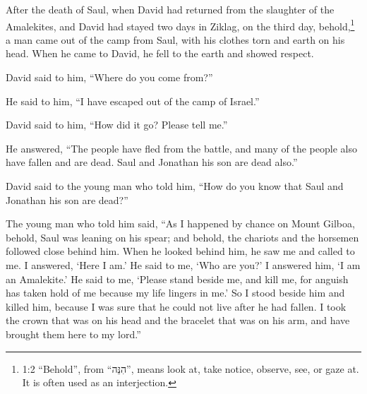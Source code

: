\newpage
\null
\thispagestyle{empty}
\newpage







\vspace{-1.36in}



\mychapter{} \myverse*{}After the death of Saul, when David had returned from the slaughter
of the Amalekites, and David had stayed two days in Ziklag,
\myverse{}on the third day, behold,\footnote{1:2 “Behold”, from “הִנֵּה”, means look at, take notice, observe, see, or gaze at. It is
	often used as an interjection.} a man came out of the camp from Saul, with his clothes torn and
earth on his head. When he came to David, he fell to the earth and showed respect.

\myverse{}David said to him, “Where do you come from?”

He said to him, “I have escaped out of the camp of Israel.”

\myverse{}David said to him, “How did it go? Please tell me.”

He answered, “The people have fled from the battle, and many of the people also have fallen
and are dead. Saul and Jonathan his son are dead also.”

\myverse{}David said to the young man who told him, “How do you know that
Saul and Jonathan his son are dead?”

\myverse{}The young man who told him said, “As I happened by chance on Mount
Gilboa, behold, Saul was leaning on his spear; and behold, the chariots and the horsemen followed close
behind him.
\myverse{}When he looked behind him, he saw me and called to me. I answered, ‘Here I am.’
\myverse{}He said to me, ‘Who are you?’ I answered him, ‘I am an Amalekite.’
\myverse{}He said to me, ‘Please stand beside me, and kill me, for anguish has taken hold
of me because my life lingers in me.’
\myverse{}So I stood beside him and killed him, because I was sure that he could not
live after he had fallen. I took the crown that was on his head and the bracelet that was on his arm,
and have brought them here to my lord.”

